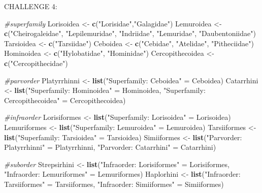 \documentclass[]{article}
\newenvironment{Shaded}{\begin{snugshade}}{\end{snugshade}}
\newcommand{\KeywordTok}[1]{\textcolor[rgb]{0.13,0.29,0.53}{\textbf{#1}}}
\newcommand{\StringTok}[1]{\textcolor[rgb]{0.31,0.60,0.02}{#1}}
\newcommand{\CommentTok}[1]{\textcolor[rgb]{0.56,0.35,0.01}{\textit{#1}}}
\newcommand{\NormalTok}[1]{#1}
\begin{document}
CHALLENGE 4:

\begin{Shaded}
\begin{Highlighting}[]
\CommentTok{#superfamily}
\NormalTok{Lorisoidea <-}\StringTok{ }\KeywordTok{c}\NormalTok{(}\StringTok{"Lorisidae"}\NormalTok{,}\StringTok{"Galagidae"}\NormalTok{)}
\NormalTok{Lemuroidea <-}\StringTok{ }\KeywordTok{c}\NormalTok{(}\StringTok{"Cheirogaleidae"}\NormalTok{, }\StringTok{"Lepilemuridae"}\NormalTok{, }\StringTok{"Indriidae"}\NormalTok{, }\StringTok{"Lemuridae"}\NormalTok{, }\StringTok{"Daubentoniidae"}\NormalTok{)}
\NormalTok{Tarsioidea <-}\StringTok{ }\KeywordTok{c}\NormalTok{(}\StringTok{"Tarsiidae"}\NormalTok{)}
\NormalTok{Ceboidea <-}\StringTok{ }\KeywordTok{c}\NormalTok{(}\StringTok{"Cebidae"}\NormalTok{, }\StringTok{"Atelidae"}\NormalTok{, }\StringTok{"Pitheciidae"}\NormalTok{)}
\NormalTok{Hominoidea <-}\StringTok{ }\KeywordTok{c}\NormalTok{(}\StringTok{"Hylobatidae"}\NormalTok{, }\StringTok{"Hominidae"}\NormalTok{)}
\NormalTok{Cercopithecoidea <-}\StringTok{ }\KeywordTok{c}\NormalTok{(}\StringTok{"Cercopithecidae"}\NormalTok{)}

\CommentTok{#parvorder}
\NormalTok{Platyrrhinni <-}\StringTok{ }\KeywordTok{list}\NormalTok{(}\StringTok{"Superfamily: Ceboidea"}\NormalTok{ =}\StringTok{ }\NormalTok{Ceboidea)}
\NormalTok{Catarrhini <-}\StringTok{ }\KeywordTok{list}\NormalTok{(}\StringTok{"Superfamily: Hominoidea"}\NormalTok{ =}\StringTok{ }\NormalTok{Hominoidea, }\StringTok{"Superfamily: Cercopithecoidea"}\NormalTok{ =}\StringTok{ }\NormalTok{Cercopithecoidea)}


\CommentTok{#infraorder}
\NormalTok{Lorisiformes <-}\StringTok{ }\KeywordTok{list}\NormalTok{(}\StringTok{"Superfamily: Lorisoidea"}\NormalTok{ =}\StringTok{ }\NormalTok{Lorisoidea)}
\NormalTok{Lemuriformes <-}\StringTok{ }\KeywordTok{list}\NormalTok{(}\StringTok{"Superfamily: Lemuroidea"}\NormalTok{ =}\StringTok{ }\NormalTok{Lemuroidea)}
\NormalTok{Tarsiiformes <-}\StringTok{ }\KeywordTok{list}\NormalTok{(}\StringTok{"Superfamily: Tarsioidea"}\NormalTok{ =}\StringTok{ }\NormalTok{Tarsioidea)}
\NormalTok{Simiiformes <-}\StringTok{ }\KeywordTok{list}\NormalTok{(}\StringTok{"Parvorder: Platyrrhinni"}\NormalTok{ =}\StringTok{ }\NormalTok{Platyrrhinni, }\StringTok{"Parvorder: Catarrhini"}\NormalTok{ =}\StringTok{ }\NormalTok{Catarrhini)}

\CommentTok{#suborder}
\NormalTok{Strepsirhini <-}\StringTok{ }\KeywordTok{list}\NormalTok{(}\StringTok{"Infraorder: Lorisiformes"}\NormalTok{ =}\StringTok{ }\NormalTok{Lorisiformes, }\StringTok{"Infraorder: Lemuriformes"}\NormalTok{ =}\StringTok{ }\NormalTok{Lemuriformes)}
\NormalTok{Haplorhini <-}\StringTok{ }\KeywordTok{list}\NormalTok{(}\StringTok{"Infraorder: Tarsiiformes"}\NormalTok{ =}\StringTok{ }\NormalTok{Tarsiiformes, }\StringTok{"Infraorder: Simiiformes"}\NormalTok{ =}\StringTok{ }\NormalTok{Simiiformes)}


\end{Highlighting}
\end{Shaded}
\end{document}
